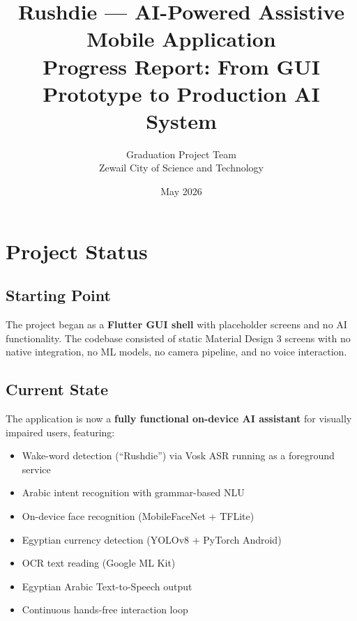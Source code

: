 \documentclass[12pt,a4paper]{article}
\title{\textbf{Rushdie --- AI-Powered Assistive Mobile Application}\\[0.5em]
\large Progress Report: From GUI Prototype to Production AI System}
\author{Graduation Project Team \\ Zewail City of Science and Technology}
\date{May 2026}
\begin{document}
\maketitle
\tableofcontents
\newpage

\section{Project Status}

\subsection{Starting Point}
The project began as a \textbf{Flutter GUI shell} with placeholder screens and no AI functionality. The codebase consisted of static Material Design 3 screens with no native integration, no ML models, no camera pipeline, and no voice interaction.

\subsection{Current State}
The application is now a \textbf{fully functional on-device AI assistant} for visually impaired users, featuring:
\begin{itemize}
  \item Wake-word detection (``Rushdie'') via Vosk ASR running as a foreground service
  \item Arabic intent recognition with grammar-based NLU
  \item On-device face recognition (MobileFaceNet + TFLite)
  \item Egyptian currency detection (YOLOv8 + PyTorch Android)
  \item OCR text reading (Google ML Kit)
  \item Egyptian Arabic Text-to-Speech output
  \item Continuous hands-free interaction loop
\end{itemize}
\end{document}
